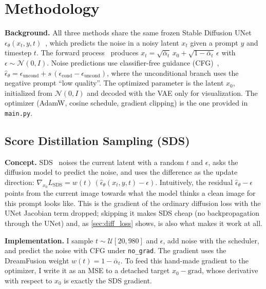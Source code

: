 \section{Methodology}
\label{sec:method}

\noindent\textbf{Background.}
All three methods share the same frozen Stable Diffusion UNet $\epsilon_\theta(x_t, y, t)$~\cite{rombach2022ldm}, which predicts the noise in a noisy latent $x_t$ given a prompt $y$ and timestep $t$.
The forward process~\cite{ho2020ddpm} produces $x_t = \sqrt{\bar\alpha_t}\,x_0 + \sqrt{1-\bar\alpha_t}\,\epsilon$ with $\epsilon\sim\mathcal N(0, I)$.
Noise predictions use classifier-free guidance (CFG)~\cite{ho2022cfg}, $\hat\epsilon_\theta = \epsilon_{\text{uncond}} + s\,(\epsilon_{\text{cond}} - \epsilon_{\text{uncond}})$, where the unconditional branch uses the negative prompt ``low quality''.
The optimized parameter is the latent $x_0$, initialized from $\mathcal N(0, I)$ and decoded with the VAE only for visualization.
The optimizer (AdamW, cosine schedule, gradient clipping) is the one provided in \texttt{main.py}.

\subsection{Score Distillation Sampling (SDS)}
\label{sec:sds}

\noindent\textbf{Concept.}
SDS~\cite{poole2023dreamfusion} noises the current latent with a random $t$ and $\epsilon$, asks the diffusion model to predict the noise, and uses the difference as the update direction:
$\nabla_{x_0} L_{\text{SDS}} = w(t)\,(\hat\epsilon_\theta(x_t, y, t) - \epsilon)$.
Intuitively, the residual $\hat\epsilon_\theta - \epsilon$ points from the current image towards what the model thinks a clean image for this prompt looks like.
This is the gradient of the ordinary diffusion loss with the UNet Jacobian term dropped; skipping it makes SDS cheap (no backpropagation through the UNet) and, as \cref{sec:diff_loss} shows, is also what makes it work at all.

\noindent\textbf{Implementation.}
I sample $t\sim\mathcal U[20, 980]$ and $\epsilon$, add noise with the scheduler, and predict the noise with CFG under \texttt{no\_grad}.
The gradient uses the DreamFusion weight $w(t)=1-\bar\alpha_t$.
To feed this hand-made gradient to the optimizer, I write it as an MSE to a detached target $x_0 - \text{grad}$, whose derivative with respect to $x_0$ is exactly the SDS gradient.

